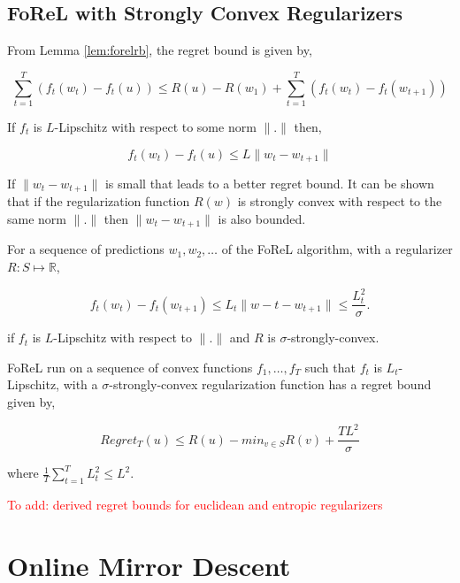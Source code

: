 \subsection{FoReL with Strongly Convex Regularizers}
From Lemma \ref{lem:forelrb}, the regret bound is given by,

$$\sum_{t=1}^T (f_t(w_t) - f_t(u)) \leq R(u) - R(w_1) + \sum_{t=1}^T (f_t(w_t) - f_t(w_{t+1}))$$

If $f_t$ is $L$-Lipschitz with respect to some norm $\|.\|$ then,

$$f_t(w_t) - f_t(u) \leq L \| w_t - w_{t+1} \|$$

If $\| w_t - w_{t+1} \|$ is small that leads to a better regret bound. It can be shown that if the regularization function $R(w)$ is strongly convex with 
respect to the same norm $\|.\|$ then $\|w_t - w_{t+1}\|$ is also bounded.

For a sequence of predictions $w_1, w_2, \ldots$ of the FoReL algorithm, with a regularizer $R: S \mapsto \mathbb{R}$,

$$f_t(w_t) - f_t(w_{t+1}) \leq L_t \|w-t - w_{t+1} \| \leq \frac{L_t^2}{\sigma}.$$

if $f_t$ is $L$-Lipschitz with respect to $\|.\|$ and $R$ is $\sigma$-strongly-convex.

\begin{theorem}\label{thm:forelregret}
    FoReL run on a sequence of convex functions $f_1, \ldots, f_T$ such that $f_t$ is $L_t$-Lipschitz, with a $\sigma$-strongly-convex regularization function 
    has a regret bound given by, 

    $$Regret_T(u) \leq R(u) - min_{v \in S} R(v) + \frac{TL^2}{\sigma}$$

    where $\frac{1}{T} \sum_{t=1}^T L_t^2 \leq L^2$.
\end{theorem}

\textcolor{red}{To add: derived regret bounds for euclidean and entropic regularizers}

\section{Online Mirror Descent}




% 

\begin{comment}
Mirror Descent:

Mirror descent with entropy regularization

Mirror descent with KL Divergence regularizations 


Mirror Descent Policy optimization (MDPO)

The update rule for on-policy MDPO is given by,

$\theta_{k+1} \leftarrow argmax_{\theta \in \Theta \psi(\theta, \theta_k)}$

$\psi(\theta, \theta_k) = \mathds{E}_{s ~ \rho_{\theta_k}}[\mathds{E}_{a~\pi_{\theta}}[A^{\theta_k}(S, a)] - \frac{1}{t_k} \textrm{KL}(s; \pi_{\theta}, \pi_{\theta_k})]$

\end{comment}

%